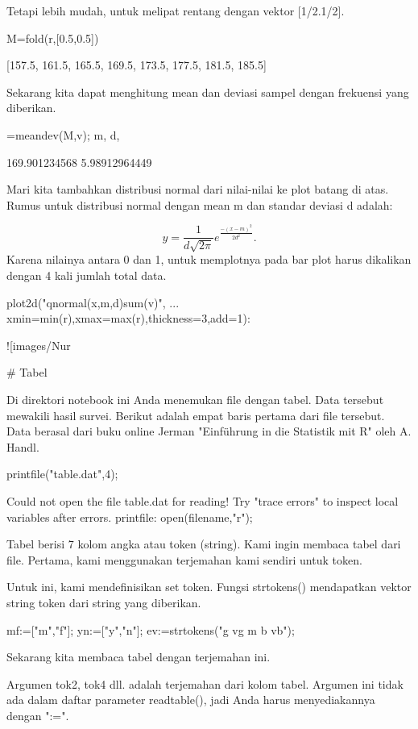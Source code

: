 \documentclass{article}
\begin{document}
Tetapi lebih mudah, untuk melipat rentang dengan vektor [1/2.1/2].


\>M=fold(r,[0.5,0.5])


    [157.5,  161.5,  165.5,  169.5,  173.5,  177.5,  181.5,  185.5]

Sekarang kita dapat menghitung mean dan deviasi sampel dengan
frekuensi yang diberikan.


=meandev(M,v); m, d,


    169.901234568
    5.98912964449

Mari kita tambahkan distribusi normal dari nilai-nilai ke plot batang
di atas. Rumus untuk distribusi normal dengan mean m dan standar
deviasi d adalah:


$$y=\frac{1}{d\sqrt{2\pi}}e^{\frac{-(x-m)^2}{2d^2}}.$$Karena nilainya antara 0 dan 1, untuk memplotnya pada bar plot harus
dikalikan dengan 4 kali jumlah total data.


\>plot2d("qnormal(x,m,d)\*sum(v)", ...  
\>     xmin=min(r),xmax=max(r),thickness=3,add=1):


![images/Nur%

# Tabel

Di direktori notebook ini Anda menemukan file dengan tabel. Data
tersebut mewakili hasil survei. Berikut adalah empat baris pertama
dari file tersebut. Data berasal dari buku online Jerman "Einführung
in die Statistik mit R" oleh A. Handl.


\>printfile("table.dat",4);


    Could not open the file
    table.dat
    for reading!
    Try "trace errors" to inspect local variables after errors.
    printfile:
        open(filename,"r");

Tabel berisi 7 kolom angka atau token (string). Kami ingin membaca
tabel dari file. Pertama, kami menggunakan terjemahan kami sendiri
untuk token.


Untuk ini, kami mendefinisikan set token. Fungsi strtokens()
mendapatkan vektor string token dari string yang diberikan.


\>mf:=["m","f"]; yn:=["y","n"]; ev:=strtokens("g vg m b vb");


Sekarang kita membaca tabel dengan terjemahan ini.


Argumen tok2, tok4 dll. adalah terjemahan dari kolom tabel. Argumen
ini tidak ada dalam daftar parameter readtable(), jadi Anda harus
menyediakannya dengan ":=".
\end{document}
